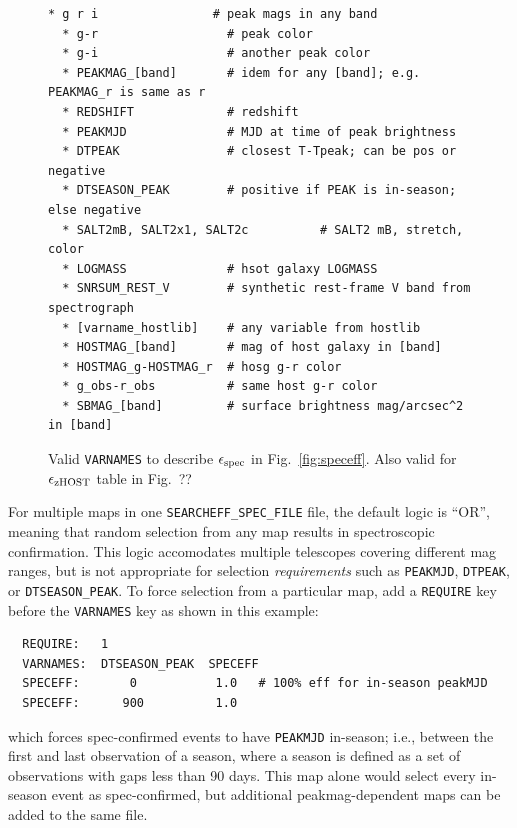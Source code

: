 \documentclass[12pt]{article}
\newcommand{\simeffspec}{\epsilon_{\rm spec}}
\newcommand{\simeffzhost}{\epsilon_{\rm zHOST}}
\begin{document}
{%
\begin{figure}[hb] 
\begin{center}
\caption{ Valid {\tt VARNAMES} to describe $\simeffspec$ in Fig.~\ref{fig:speceff}.
          Also valid for $\simeffzhost$ table in Fig.~??}
\label{fig:searcheff_varnames}
\begin{Verbatim}[frame=single]
  * g r i                # peak mags in any band
  * g-r                  # peak color
  * g-i                  # another peak color
  * PEAKMAG_[band]       # idem for any [band]; e.g. PEAKMAG_r is same as r
  * REDSHIFT             # redshift
  * PEAKMJD              # MJD at time of peak brightness
  * DTPEAK               # closest T-Tpeak; can be pos or negative
  * DTSEASON_PEAK        # positive if PEAK is in-season; else negative
  * SALT2mB, SALT2x1, SALT2c          # SALT2 mB, stretch, color
  * LOGMASS              # hsot galaxy LOGMASS
  * SNRSUM_REST_V        # synthetic rest-frame V band from spectrograph
  * [varname_hostlib]    # any variable from hostlib
  * HOSTMAG_[band]       # mag of host galaxy in [band]
  * HOSTMAG_g-HOSTMAG_r  # hosg g-r color
  * g_obs-r_obs          # same host g-r color
  * SBMAG_[band]         # surface brightness mag/arcsec^2 in [band]
\end{Verbatim}
\end{center}
\end{figure}


For multiple maps in one \verb|SEARCHEFF_SPEC_FILE| file,
the default logic is ``OR'', meaning that
random selection from any map results in spectroscopic confirmation.
This logic accomodates multiple telescopes covering different
mag ranges, but is not appropriate for selection {\it requirements}
such as {\tt PEAKMJD}, {\tt DTPEAK}, or {\tt DTSEASON\_PEAK}.
To force selection from a particular map, add a {\tt REQUIRE}
key before the {\tt VARNAMES} key as shown in this example:
%
\begin{verbatim}
  REQUIRE:   1
  VARNAMES:  DTSEASON_PEAK  SPECEFF
  SPECEFF:       0           1.0   # 100% eff for in-season peakMJD
  SPECEFF:      900          1.0
\end{verbatim}
%
which forces spec-confirmed events to have {\tt PEAKMJD} in-season;
i.e., between the first and last observation of a season, where
a season is defined as a set of observations with gaps less than 90 days.
This map alone would select every in-season event as spec-confirmed,
but additional peakmag-dependent maps can be added to the same file.


}
\end{document}
